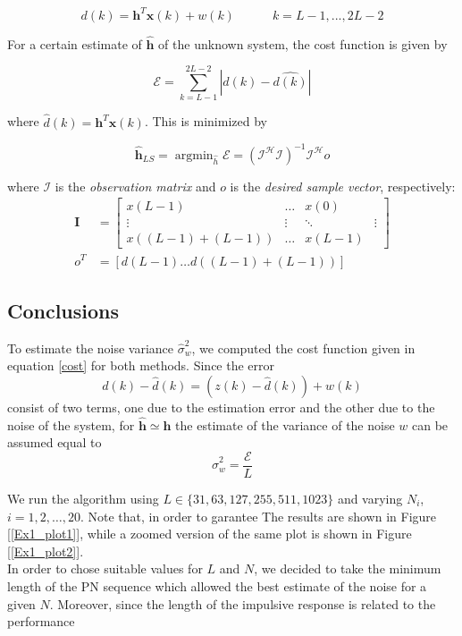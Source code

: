 \documentclass[a4paper, 12pt]{report}
\DeclareMathOperator*{\argmin}{argmin}
\begin{document}
\begin{equation*}
d(k) = \mathbf{h}^T\mathbf{x}(k)+w(k) \quad\quad\quad k=L-1,...,2L-2
\end{equation*}

For a certain estimate of \textbf{$\mathbf{\hat{h}}$} of the unknown system, the cost function is given by

\begin{equation}\label{cost}
\mathcal{E} = \sum_{k=L-1}^{2L-2}|d(k)-\hat{d(k)}|
\end{equation}

where $\hat{d}(k)=\mathbf{h}^T\mathbf{x}(k)$. This is minimized by 

\begin{equation}
\mathbf{\hat{h}}_{LS} = \argmin_{\hat{h}} \mathcal{E} = (\mathcal{I^HI})^{-1}\mathcal{I^H}o 
\end{equation}

where $\mathcal{I}$ is the \textit{observation matrix} and $o$ is the \textit{desired sample vector}, respectively:
\begin{equation*}
\begin{split}
\mathbf{I} &= \begin{bmatrix}
x(L-1) & \dots & x(0) \\
\vdots & \vdots & \ddots & \vdots \\
x((L-1)+(L-1)) &  \dots & x(L-1)
\end{bmatrix} \\
o^T &= [d(L-1) \dots d((L-1)+(L-1))]
\end{split}
\end{equation*}

\subsection*{Conclusions}
To estimate the noise variance $\hat{\sigma}_w^2$, we computed the cost function given in equation \ref{cost} for both methods. Since the error
\begin{equation*}
d(k) - \hat{d}(k) = (z(k)-\hat{d}(k))+w(k)
\end{equation*}
consist of two terms, one due to the estimation error and the other due to the noise of the system, for $\mathbf{\hat{h}}\simeq\mathbf{h}$ the estimate of the variance of the noise $w$ can be assumed equal to 
\begin{equation*}
\hat{\sigma}_w^2 = \frac{\mathcal{E}}{L}
\end{equation*} 

We run the algorithm using $L\in \{31,63, 127, 255, 511, 1023\}$ and varying $N_i$, $i=1,2,\dots,20$. Note that, in order to garantee  The results are shown in Figure [\ref{Ex1_plot1}], while a zoomed version of the same plot is shown in Figure [\ref{Ex1_plot2}].\\
In order to chose suitable values for $L$ and $N$, we decided to take the minimum length of the PN sequence which allowed the best estimate of the noise for a given $N$. Moreover, since the length of the impulsive response is related to the performance 
\end{document}
